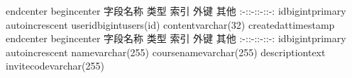 {}\markdownRendererBackslash{}end\markdownRendererLeftBrace{}center\markdownRendererRightBrace{}\markdownRendererInterblockSeparator
{}\markdownRendererInterblockSeparator
{}\markdownRendererBackslash{}begin\markdownRendererLeftBrace{}center\markdownRendererRightBrace{}\markdownRendererInterblockSeparator
{}\markdownRendererPipe{} 字段名称 \markdownRendererPipe{} 类型 \markdownRendererPipe{} 索引 \markdownRendererPipe{} 外键 \markdownRendererPipe{} 其他 \markdownRendererPipe{} \markdownRendererPipe{}:-:\markdownRendererPipe{}:-:\markdownRendererPipe{}:-:\markdownRendererPipe{}:-:\markdownRendererPipe{} \markdownRendererPipe{}id\markdownRendererPipe{}bigint\markdownRendererPipe{}primary\markdownRendererPipe{}\markdownRendererPipe{} auto\markdownRendererBackslash{}\markdownRendererUnderscore{}increscent\markdownRendererPipe{} \markdownRendererPipe{}user\markdownRendererBackslash{}\markdownRendererUnderscore{}id\markdownRendererPipe{}bigint\markdownRendererPipe{}\markdownRendererPipe{}users(id)\markdownRendererPipe{}\markdownRendererPipe{} \markdownRendererPipe{}content\markdownRendererPipe{}varchar(32)\markdownRendererPipe{}\markdownRendererPipe{}\markdownRendererPipe{}\markdownRendererPipe{} \markdownRendererPipe{}created\markdownRendererBackslash{}\markdownRendererUnderscore{}at\markdownRendererPipe{}timestamp\markdownRendererPipe{}\markdownRendererPipe{}\markdownRendererPipe{}\markdownRendererPipe{}\markdownRendererInterblockSeparator
{}\markdownRendererBackslash{}end\markdownRendererLeftBrace{}center\markdownRendererRightBrace{}\markdownRendererInterblockSeparator
{}\markdownRendererInterblockSeparator
{}\markdownRendererBackslash{}begin\markdownRendererLeftBrace{}center\markdownRendererRightBrace{}\markdownRendererInterblockSeparator
{}\markdownRendererPipe{} 字段名称 \markdownRendererPipe{} 类型 \markdownRendererPipe{} 索引 \markdownRendererPipe{} 外键 \markdownRendererPipe{} 其他 \markdownRendererPipe{} \markdownRendererPipe{}:-:\markdownRendererPipe{}:-:\markdownRendererPipe{}:-:\markdownRendererPipe{}:-:\markdownRendererPipe{} \markdownRendererPipe{}id\markdownRendererPipe{}bigint\markdownRendererPipe{}primary\markdownRendererPipe{}\markdownRendererPipe{} auto\markdownRendererBackslash{}\markdownRendererUnderscore{}increscent\markdownRendererPipe{} \markdownRendererPipe{}name\markdownRendererPipe{}varchar(255)\markdownRendererPipe{}\markdownRendererPipe{}\markdownRendererPipe{}\markdownRendererPipe{} \markdownRendererPipe{}course\markdownRendererBackslash{}\markdownRendererUnderscore{}name\markdownRendererPipe{}varchar(255)\markdownRendererPipe{}\markdownRendererPipe{}\markdownRendererPipe{}\markdownRendererPipe{} \markdownRendererPipe{}description\markdownRendererPipe{}text\markdownRendererPipe{}\markdownRendererPipe{}\markdownRendererPipe{}\markdownRendererPipe{} \markdownRendererPipe{}invite\markdownRendererBackslash{}\markdownRendererUnderscore{}code\markdownRendererPipe{}varchar(255)\markdownRendererPipe{}\markdownRendererPipe{}\markdownRendererPipe{}\markdownRendererPipe{}\markdownRendererInterblockSeparator
